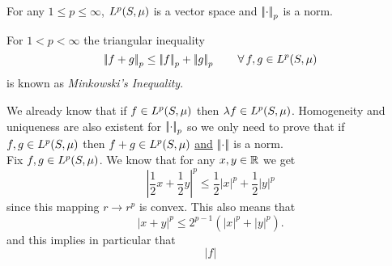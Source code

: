 \documentclass{article}
\begin{document}
\begin{theorem}
	For any $1\leq p\leq\infty$, $L^{p}(S,\mu)$ is a vector space and $\left|\negthinspace\left|\cdot\right|\negthinspace\right|_{p}$ is a norm.
\end{theorem}
\begin{remark}
	For $1<p<\infty$ the triangular inequality
	\begin{equation*}
		\left|\negthinspace\left|f+g\right|\negthinspace\right|_p\leq\left|\negthinspace\left|f\right|\negthinspace\right|_p+\left|\negthinspace\left|g\right|\negthinspace\right|_p\qquad\forall\, f,g\in L^{p}(S,\mu)
	\end{equation*}
	is known as \emph{Minkowski's Inequality}.
\end{remark}
\begin{fancyproof}
	We already know that if $f\in L^{p}(S,\mu)$ then $\lambda f\in L^{p}(S,\mu)$. Homogeneity and uniqueness are also existent for $\left|\negthinspace\left|\cdot\right|\negthinspace\right|_p$ so we only need to prove that if $f,g\in L^{p}(S,\mu)$ then $f+g\in L^{p}(S,\mu)$ \underline{and} $\left|\negthinspace\left|\cdot\right|\negthinspace\right|$ is a norm. \\
	Fix $f,g\in L^{p}(S,\mu)$. We know that for any $x,y\in\mathbb{R}$ we get
	\begin{equation*}
		\left|\frac{1}{2}x+\frac{1}{2}y\right|^{p}\leq\frac{1}{2}|x|^p+\frac{1}{2}|y|^{p}
	\end{equation*}
	since this mapping $r\to r^p$ is convex. This also means that
	\begin{equation*}
		\left|x+y\right|^p\leq2^{p-1}\left(|x|^{p}+|y|^{p}\right).
	\end{equation*}
	and this implies in particular that
	\begin{equation*}
		\left|f\right|
	\end{equation*}
\end{fancyproof}
\end{document}
